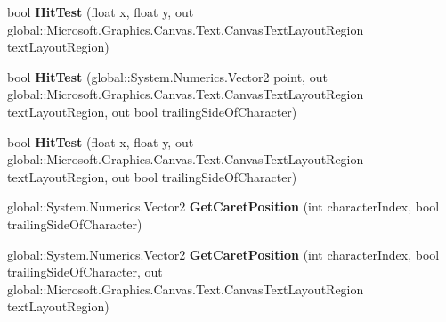 \begin{DoxyCompactItemize}
\item 
\mbox{\label{interface_microsoft_1_1_graphics_1_1_canvas_1_1_text_1_1_i_canvas_text_layout_a1620bdefefce95ef2ae5525645e72e66}} 
bool {\bfseries Hit\+Test} (float x, float y, out global\+::\+Microsoft.\+Graphics.\+Canvas.\+Text.\+Canvas\+Text\+Layout\+Region text\+Layout\+Region)
\item 
\mbox{\label{interface_microsoft_1_1_graphics_1_1_canvas_1_1_text_1_1_i_canvas_text_layout_ae4c70cf259e0ada5180a328f0e176122}} 
bool {\bfseries Hit\+Test} (global\+::\+System.\+Numerics.\+Vector2 point, out global\+::\+Microsoft.\+Graphics.\+Canvas.\+Text.\+Canvas\+Text\+Layout\+Region text\+Layout\+Region, out bool trailing\+Side\+Of\+Character)
\item 
\mbox{\label{interface_microsoft_1_1_graphics_1_1_canvas_1_1_text_1_1_i_canvas_text_layout_a457ec60b8296c34aec79cbe740e5f6b3}} 
bool {\bfseries Hit\+Test} (float x, float y, out global\+::\+Microsoft.\+Graphics.\+Canvas.\+Text.\+Canvas\+Text\+Layout\+Region text\+Layout\+Region, out bool trailing\+Side\+Of\+Character)
\item 
\mbox{\label{interface_microsoft_1_1_graphics_1_1_canvas_1_1_text_1_1_i_canvas_text_layout_a1ed232fe08a85f9c93273ae59226368a}} 
global\+::\+System.\+Numerics.\+Vector2 {\bfseries Get\+Caret\+Position} (int character\+Index, bool trailing\+Side\+Of\+Character)
\item 
\mbox{\label{interface_microsoft_1_1_graphics_1_1_canvas_1_1_text_1_1_i_canvas_text_layout_a5f70488facfba5d5a53175e0fbdb74e0}} 
global\+::\+System.\+Numerics.\+Vector2 {\bfseries Get\+Caret\+Position} (int character\+Index, bool trailing\+Side\+Of\+Character, out global\+::\+Microsoft.\+Graphics.\+Canvas.\+Text.\+Canvas\+Text\+Layout\+Region text\+Layout\+Region)
\item 
\mbox{\label{interface_microsoft_1_1_graphics_1_1_canvas_1_1_text_1_1_i_canvas_text_layout_a9ce2304a76b40116670a355bc5982d5b}} 

\end{DoxyCompactItemize}
